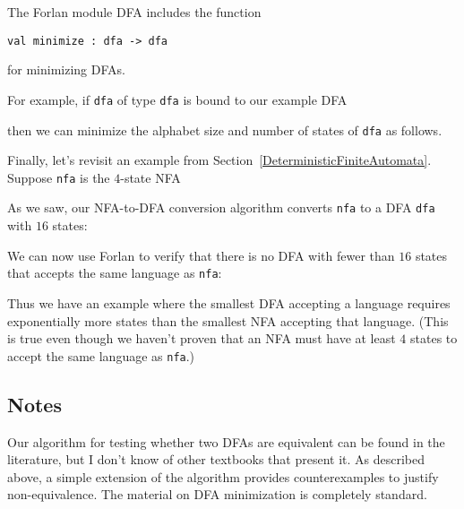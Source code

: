 The Forlan module DFA includes the function
\begin{verbatim}
val minimize : dfa -> dfa
\end{verbatim}
%
for minimizing DFAs.

For example, if \texttt{dfa} of type \texttt{dfa} is bound to our example
DFA
\begin{center}

\end{center}
then we can minimize the alphabet size and number of states of \texttt{dfa}
as follows.


Finally, let's revisit an example from
Section~\ref{DeterministicFiniteAutomata}. Suppose \texttt{nfa} is the
$4$-state NFA
\begin{center}

\end{center}
As we saw, our NFA-to-DFA conversion algorithm converts \texttt{nfa}
to a DFA \texttt{dfa} with $16$ states:



We can now use Forlan to verify that there is no DFA with fewer than
$16$ states that accepts the same language as \texttt{nfa}:



Thus we have an example where the smallest DFA accepting a language
requires exponentially more states than the smallest NFA accepting that
language. (This is true even though we haven't proven that an NFA
must have at least $4$ states to accept the same language as \texttt{nfa}.)

\subsection{Notes}

Our algorithm for testing whether two DFAs are equivalent can be found
in the literature, but I don't know of other textbooks that present
it.  As described above, a simple extension of the algorithm provides
counterexamples to justify non-equivalence.  The material on DFA
minimization is completely standard.

